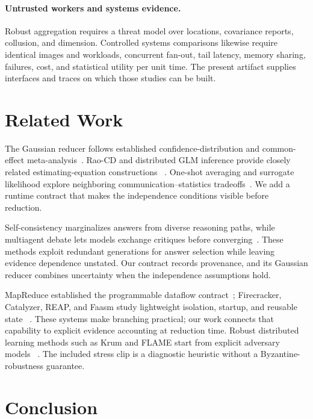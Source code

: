 \paragraph{Untrusted workers and systems evidence.}
Robust aggregation requires a threat model over locations, covariance reports, collusion, and
dimension. Controlled systems comparisons likewise require identical images and workloads,
concurrent fan-out, tail latency, memory sharing, failures, cost, and statistical utility per
unit time. The present artifact supplies interfaces and traces on which those studies can be
built.

\section{Related Work}
\label{sec:related}

The Gaussian reducer follows established confidence-distribution and common-effect
meta-analysis~\cite{singh2005combining,xie2011meta,cochran1954combination}. Rao-CD and
distributed GLM inference provide closely related estimating-equation constructions
~\cite{zhou2017raocd,tang2020distributed}. One-shot averaging and surrogate likelihood explore
neighboring communication--statistics tradeoffs~\cite{zhang2013oneshot,jordan2019csl}. We add a
runtime contract that makes the independence conditions visible before reduction.

Self-consistency marginalizes answers from diverse reasoning paths, while multiagent debate lets
models exchange critiques before converging~\cite{wang2023selfconsistency,du2024multiagent}.
These methods exploit redundant generations for answer selection while leaving evidence
dependence unstated. Our contract records provenance, and its Gaussian reducer combines
uncertainty when the independence assumptions hold.

MapReduce established the programmable dataflow contract~\cite{dean2004mapreduce}; Firecracker,
Catalyzer, REAP, and Faasm study lightweight isolation, startup, and reusable state
~\cite{agache2020firecracker,du2020catalyzer,ustiugov2021reap,shillaker2020faasm}. These systems
make branching practical; our work connects that capability to explicit evidence accounting at
reduction time. Robust distributed
learning methods such as Krum and FLAME start from explicit adversary models
~\cite{blanchard2017krum,nguyen2022flame}. The included stress clip is a diagnostic heuristic
without a Byzantine-robustness guarantee.

\section{Conclusion}
\label{sec:conclusion}


